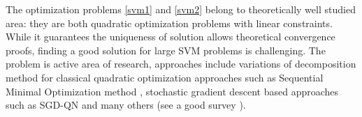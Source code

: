 The optimization problems \ref{svm1} and \ref{svm2} belong to theoretically well studied area: they are both quadratic optimization problems with linear constraints. While it guarantees the uniqueness of solution allows theoretical convergence proofs, finding a good solution for large SVM problems is challenging. The problem is active area of research, approaches include variations of decomposition method for classical quadratic optimization approaches such as Sequential Minimal Optimization method \cite{SMOplatt}, stochastic gradient descent based approaches such as SGD-QN \cite{bordes2009sgd} and many others (see a good survey \cite{largeSVM}).